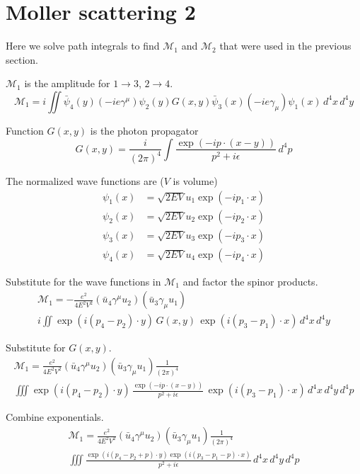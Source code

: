 

\section*{Moller scattering 2}

Here we solve path integrals to find $\mathcal M_1$ and $\mathcal M_2$
that were used in the previous section.

\bigskip
$\mathcal M_1$ is the amplitude for $1\rightarrow3$, $2\rightarrow4$.
\begin{equation*}
\mathcal M_1=i\iint
\bar\psi_4(y)
(-ie\gamma^\mu)
\psi_2(y)
G(x,y)
\bar\psi_3(x)
(-ie\gamma_\mu)
\psi_1(x)
\,d^4x\,d^4y
\end{equation*}

Function $G(x,y)$ is the photon propagator
\begin{equation*}
G(x,y)=\frac{i}{(2\pi)^4}\int\frac{\exp(-ip\cdot(x-y))}{p^2+i\epsilon}\,d^4p
\end{equation*}

The normalized wave functions are ($V$ is volume)
\begin{align*}
\psi_1(x)&=\sqrt{2EV}u_1\exp(-ip_1\cdot x)
\\
\psi_2(x)&=\sqrt{2EV}u_2\exp(-ip_2\cdot x)
\\
\psi_3(x)&=\sqrt{2EV}u_3\exp(-ip_3\cdot x)
\\
\psi_4(x)&=\sqrt{2EV}u_4\exp(-ip_4\cdot x)
\end{align*}

Substitute for the wave functions in $\mathcal M_1$ and factor the spinor products.
\begin{multline*}
\mathcal M_1=-\frac{e^2}{4E^2V^2}(\bar u_4\gamma^\mu u_2)(\bar u_3\gamma_\mu u_1)
\\
i \iint
{\exp(i(p_4-p_2)\cdot y)}
\,G(x,y)\,
{\exp(i(p_3-p_1)\cdot x)}
\,d^4x\,d^4y
\end{multline*}

Substitute for $G(x,y)$.
\begin{multline*}
\mathcal M_1=\frac{e^2}{4E^2V^2}(\bar u_4\gamma^\mu u_2)(\bar u_3\gamma_\mu u_1)
\frac{1}{(2\pi)^4}
\\
\iiint
{\exp(i(p_4-p_2)\cdot y)}
\,{\frac{\exp(-ip\cdot(x-y))}{p^2+i\epsilon}}\,
{\exp(i(p_3-p_1)\cdot x)}
\,d^4x\,d^4y\,d^4p
\end{multline*}

Combine exponentials.
\begin{multline*}
\mathcal M_1=\frac{e^2}{4E^2V^2}(\bar u_4\gamma^\mu u_2)(\bar u_3\gamma_\mu u_1)
\frac{1}{(2\pi)^4}
\\
\iiint
\frac{\exp(i(p_4-p_2+p)\cdot y)\exp(i(p_3-p_1-p)\cdot x)}{p^2+i\epsilon}
\,d^4x\,d^4y\,d^4p
\end{multline*}

